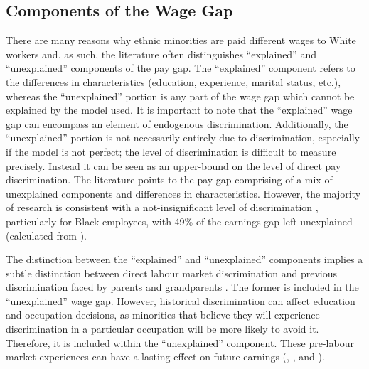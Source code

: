 \documentclass[class=article, crop=false]{standalone}
\begin{document}
\subsection{Components of the Wage Gap}
\label{sec:components}
There are many reasons why ethnic minorities are paid different wages to White workers and. as such, the literature often distinguishes \enquote{explained} and \enquote{unexplained} components of the pay gap. The \enquote{explained} component refers to the differences in characteristics (education, experience, marital status, etc.), whereas the \enquote{unexplained} portion is any part of the wage gap which cannot be explained by the model used. It is important to note that the \enquote{explained} wage gap can encompass an element of endogenous discrimination. Additionally, the \enquote{unexplained} portion is not necessarily entirely due to discrimination, especially if the model is not perfect; the level of discrimination is difficult to measure precisely. Instead it can be seen as an upper-bound on the level of direct pay discrimination. The literature points to the pay gap comprising of a mix of unexplained components and differences in characteristics. However, the majority of research is consistent with a not-insignificant level of discrimination \citep{Metcalf}, particularly for Black employees, with 49\% of the earnings gap left unexplained (calculated from \citet[p.~374]{Blackaby}).

The distinction between the \enquote{explained} and \enquote{unexplained} components implies a subtle distinction between direct labour market discrimination and previous discrimination faced by parents and grandparents \citep{Lundberg}. The former is included in the \enquote{unexplained} wage gap. However, historical discrimination can affect education and occupation decisions, as minorities that believe they will experience discrimination in a particular occupation will be more likely to avoid it. Therefore, it is included within the \enquote{unexplained} component. These pre-labour market experiences can have a lasting effect on future earnings (\citet{Altonji}, \citet{Hedman}, and \citet{Berthoud}).
\end{document}
